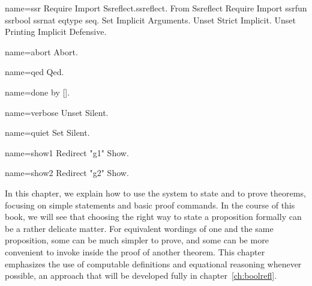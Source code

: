 \begin{coqdef}{name=ssr}
Require Import Ssreflect.ssreflect.
From Ssreflect Require Import ssrfun ssrbool ssrnat eqtype seq.
Set Implicit Arguments.
Unset Strict Implicit.
Unset Printing Implicit Defensive.
\end{coqdef}
\begin{coqdef}{name=abort}
Abort.
\end{coqdef}
\begin{coqdef}{name=qed}
Qed.
\end{coqdef}
\begin{coqdef}{name=done}
by [].
\end{coqdef}
\begin{coqdef}{name=verbose}
Unset Silent.
\end{coqdef}
\begin{coqdef}{name=quiet}
Set Silent.
\end{coqdef}
\begin{coqdef}{name=show1}
Redirect "g1" Show.
\end{coqdef}
\begin{coqdef}{name=show2}
Redirect "g2" Show.
\end{coqdef}

\label{ch:proofs}

In this chapter, we explain how to use the \Coq{} system to state and
to prove theorems, focusing on simple statements and basic proof
commands. In the course of this book, we will see that choosing the
right way to state a proposition formally can be a rather delicate
matter. For equivalent wordings of one and the same
proposition, some can be
much simpler to prove, and some can be more convenient to invoke
inside the proof of another theorem. This chapter emphasizes
the use of computable definitions and equational reasoning
whenever possible, an approach that will be developed fully in
chapter~\ref{ch:boolrefl}.



